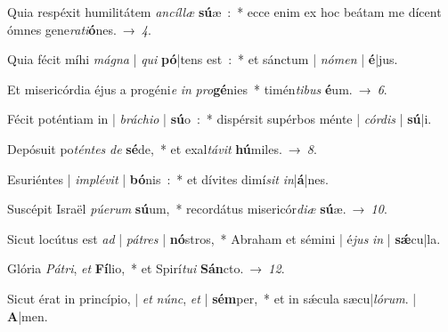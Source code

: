 ﻿\item Quia respéxit humilitátem \emph{an}\-\emph{cíl}\-\emph{læ} \textbf{sú}æ~:~*
ecce enim ex hoc beátam me dícent ómnes gene\emph{ra}\emph{ti}\textbf{ó}nes.~→~\emph{4}.
\item Quia fécit míhi \emph{má}\-\emph{gna} | \emph{qui} \textbf{pó}|tens est~:~*
et sánctum | \emph{nó}\-\emph{men} | \textbf{é}|jus.
\item Et misericórdia éjus a progéni\emph{e} \emph{in} \emph{pro}\textbf{gé}nies~*
timén\emph{ti}\-\emph{bus} \textbf{é}um.~→~\emph{6}.
\item Fécit poténtiam in | \emph{brá}\-\emph{chi}\-\emph{o} | \textbf{sú}o~:~*
dispérsit supérbos ménte | \emph{cór}\-\emph{dis} | \textbf{sú}|i.
\item Depósuit po\emph{tén}\-\emph{tes} \emph{de} \textbf{sé}de,~*
et exal\emph{tá}\-\emph{vit} \textbf{hú}miles.~→~\emph{8}.
\item Esuriéntes | \emph{im}\-\emph{plé}\-\emph{vit} | \textbf{bó}nis~:~*
et dívites dimí\emph{sit} \emph{in}|\textbf{á}|nes.
\item Suscépit Israël \emph{pú}\-\emph{e}\-\emph{rum} \textbf{sú}um,~*
recordátus misericór\emph{di}\-\emph{æ} \textbf{sú}æ.~→~\emph{10}.
\item Sicut locútus est \emph{ad} | \emph{pá}\-\emph{tres} | \textbf{nó}stros,~*
Abraham et sémini | é\emph{jus} \emph{in} | \textbf{sǽ}cu|la.
\item Glória \emph{Pá}\-\emph{tri}, \emph{et} \textbf{Fí}lio,~*
et Spirí\emph{tu}\-\emph{i} \textbf{Sán}cto.~→~\emph{12}.
\item Sicut érat in princípio, | \emph{et} \emph{núnc}, \emph{et} | \textbf{sém}per,~*
et in sǽcula sæcu|\emph{ló}\-\emph{rum}. | \textbf{A}|men.
